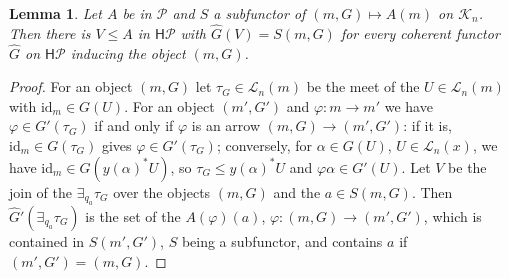 \documentclass[11pt]{amsart}
\newtheorem{lem}[thm]{Lemma}
\theoremstyle{definition}
\newcommand{\HH}{\mathsf H}
\newcommand{\cK}{\mathcal K}
\begin{document}
\begin{lem}\label{lem:definable}
Let $A$ be in $\mathcal P$ and $S$ a subfunctor of $(m,G)\mapsto A(m)$
on $\cK_n$. Then there is $V\le A$ in $\HH\mathcal P$ with $\hat G(V)=
S(m,G)$ for every coherent functor $\hat G$ on $\HH\mathcal P$ inducing
the object $(m,G)$.
\end{lem}
\begin{proof}
For an object $(m,G)$ let $\tau_G\in\mathcal L_n(m)$ be the meet of the
$U\in\mathcal L_n(m)$ with $\mathrm{id}_m\in G(U)$. For an object
$(m',G')$ and $\varphi\colon m\to m'$ we have $\varphi\in G'(\tau_G)$
if and only if $\varphi$ is an arrow $(m,G)\to(m',G')$: if it is,
$\mathrm{id}_m\in G(\tau_G)$ gives $\varphi\in G'(\tau_G)$; conversely,
for $\alpha\in G(U)$, $U\in\mathcal L_n(x)$, we have $\mathrm{id}_m\in
G(y(\alpha)^*U)$, so $\tau_G\le y(\alpha)^*U$ and $\varphi\alpha\in
G'(U)$. Let $V$ be the join of the $\exists_{q_a}\tau_G$ over the
objects $(m,G)$ and the $a\in S(m,G)$. Then $\hat G'(\exists_{q_a}
\tau_G)$ is the set of the $A(\varphi)(a)$, $\varphi\colon(m,G)\to
(m',G')$, which is contained in $S(m',G')$, $S$ being a subfunctor, and
contains $a$ if $(m',G')=(m,G)$.
\end{proof}
\end{document}
